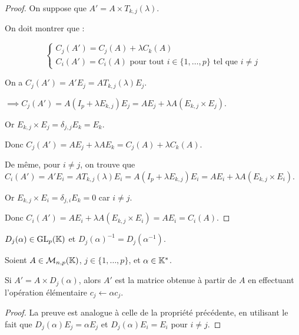 \documentclass[12pt,a4paper]{report}
\begin{document}
\begin{proof}
    On suppose que $A' = A \times T_{k,j}(\lambda)$.

    On doit montrer que :

    $$\begin{cases}
        C_j(A') = C_j(A) + \lambda C_k(A) \\
        C_i(A') = C_i(A) \text{ pour tout } i \in \{1,\dots,p\} \text{ tel que } i \ne j
    \end{cases}$$

    On a $C_j(A') = A' E_j = A T_{k,j}(\lambda) E_j$.

    $\implies C_j(A') = A(I_p + \lambda E_{k,j}) E_j = A E_j + \lambda A (E_{k,j}\times E_j)$.

    Or $E_{k,j}\times E_j = \delta_{j,j} E_k = E_k$.

    Donc $C_j(A') = A E_j + \lambda A E_k = C_j(A) + \lambda C_k(A)$.

    De même, pour $i \ne j$, on trouve que $C_i(A') = A' E_i = A T_{k,j}(\lambda) E_i = A (I_p + \lambda E_{k,j}) E_i = A E_i + \lambda A (E_{k,j}\times E_i)$.

    Or $E_{k,j}\times E_i = \delta_{j,i} E_k = 0$ car $i \ne j$.

    Donc $C_i(A') = A E_i + \lambda A (E_{k,j}\times E_i) = A E_i = C_i(A)$.

\end{proof}

\begin{property}
    $D_j(\alpha) \in \mathrm{GL}_p(\mathbb{K})$ et $D_j(\alpha)^{-1} = D_j(\alpha^{-1})$.
\end{property}

\begin{property}
    Soient $A \in \mathcal M_{n,p}(\mathbb{K})$, $j \in \{1,\dots,p\}$, et $\alpha \in \mathbb{K}^*$.

    Si $A' = A \times D_j(\alpha)$, alors $A'$ est la matrice obtenue à partir de $A$ en effectuant l'opération élémentaire $c_j \leftarrow \alpha c_j$.
\end{property}

\begin{proof}
    La preuve est analogue à celle de la propriété précédente, en utilisant le fait que $D_j(\alpha) E_j = \alpha E_j$ et $D_j(\alpha) E_i = E_i$ pour $i \ne j$.
\end{proof}
\end{document}
